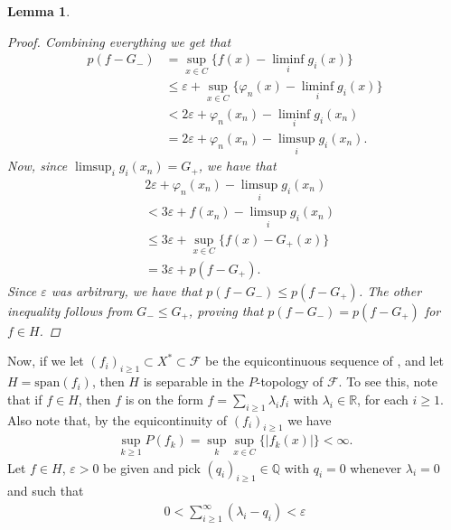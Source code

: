 \documentclass[10pt,twoside,openany,final]{memoir}
\theoremstyle{break}
\newtheorem{lemma}[section]{Lemma}
\theoremstyle{Break}
\newcommand{\R}{\mathbb{R}}
\newcommand{\Q}{\mathbb{Q}}
\begin{document}
\begin{lemma}
\begin{proof}
Combining everything we get that
\begin{align*}
p(f-G_{-})&=\sup_{x \in C} \{ f(x) - \liminf_{i} g_{i}(x) \} \\
&\leq \varepsilon + \sup_{x \in C} \{\varphi_{n}(x) - \liminf_{i} g_{i}(x) \} \tag{by (b)}\\
&< 2 \varepsilon + \varphi_{n}(x_{n})- \liminf_{i} g_{i}(x_{n}) \tag{by (a) and (ii)}\\
&=2 \varepsilon + \varphi_{n}(x_{n})- \limsup_{i} g_{i}(x_{n}).
\end{align*}
Now, since $\displaystyle \limsup_{i} g_{i}(x_{n})=G_{+}$, we have that
\begin{align*}
&2 \varepsilon + \varphi_{n}(x_{n})- \limsup_{i} g_{i}(x_{n}) \\
&< 3\varepsilon + f(x_{n}) - \limsup_{i}g_{i} (x_{n}) \tag{by (b)}\\
&\leq 3 \varepsilon + \sup_{x \in C} \{ f(x)-G_{+}(x)\}\\
&= 3 \varepsilon + p(f-G_{+}).
\end{align*}
Since $\varepsilon$ was arbitrary, we have that $p(f-G_{-}) \leq p(f-G_{+})$. The other inequality follows from $G_{-} \leq G_{+}$, proving that $p(f-G_{-})=p(f-G_{+})$ for $f \in H$.
\end{proof}
\end{lemma}
Now, if we let $(f_{i})_{i \geq 1} \subset X^* \subset \mathcal{F}$ be the equicontinuous sequence of , and let $H=\text{span}(f_{i})$, then $H$ is separable in the $P$-topology of $\mathcal{F}$. To see this, note that if $f \in H$, then $f$ is on the form $f=\sum_{i \geq 1} \lambda_{i} f_{i}$ with $\lambda_{i} \in \R$, for each $i\geq 1$. Also note that, by the equicontinuity of $(f_{i})_{i\geq 1}$ we have
\begin{align*}
\sup_{k\geq 1}P(f_{k})=\sup_{k}\sup_{x\in C} \{|f_{k}(x)|\}<\infty.
\end{align*}
Let $f \in H$, $\varepsilon>0$ be given and pick $(q_{i})_{i\geq 1} \in \Q$ with $q_i=0$ whenever $\lambda_i=0$ and such that 
\begin{align*}
0< \sum_{i \geq 1}^\infty (\lambda_{i}-q_{i}) < \varepsilon
\end{align*}
\end{document}

